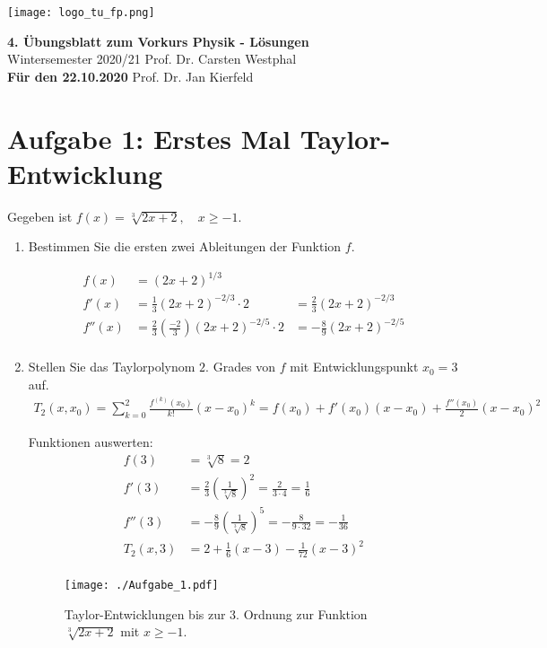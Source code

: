 \documentclass[11pt,a4paper, parskip=half ]{report}
\newcommand{\GrosserAbstand}{\\[12pt]}
\begin{document}
\texttt{[image: logo\_tu\_fp.png]}
\begin{center}
\Large{\textbf{4. \"Ubungsblatt zum Vorkurs Physik - Lösungen}}
\GrosserAbstand
\normalsize
Wintersemester 2020/21 \hfill Prof. Dr. Carsten Westphal\\
\textbf{Für den 22.10.2020} \hfill Prof. Dr. Jan Kierfeld \\
\end{center}

%
%
%
%


\section*{Aufgabe 1: Erstes Mal Taylor-Entwicklung}
  Gegeben ist $f(x) = \sqrt[3]{2x + 2}, \quad x \geq -1$.
  \begin{enumerate}
    \item Bestimmen Sie die ersten zwei Ableitungen der Funktion $f$.
    
    \vspace{20pt}
    \begin{align*}
    f(x) &= (2x + 2)^{1/3} \\ 
    f'(x) &= \frac{1}{3} (2x + 2)^{-2/3} \cdot 2 &= \frac{2}{3} (2x + 2)^{-2/3} \\ 
    f''(x) &= \frac{2}{3} \left(\frac{-2}{3}\right) (2x + 2)^{-2/5} \cdot 2 &= -\frac{8}{9} (2x + 2)^{-2/5} \\ 
    \end{align*}

    \item Stellen Sie das Taylorpolynom $2.$ Grades von $f$ mit Entwicklungspunkt $x_0 = 3$ auf.
    \vspace{20pt}
    \begin{align*}
      T_2(x, x_0) = \sum_{k = 0}^{2} \frac{f^{(k)} (x_0)}{k!} (x - x_0)^k = f(x_0) + f'(x_0)(x-x_0) + \frac{f''(x_0)}{2}(x - x_0)^2 
      \end{align*}

      Funktionen auswerten: 
      \begin{align*}
        f(3) &= \sqrt[3]{8} = 2 \\
        f'(3) &= \frac{2}{3} (\frac{1}{\sqrt[3]{8}})^2 = \frac{2}{3 \cdot 4} = \frac{1}{6} \\
        f''(3) &= -\frac{8}{9} (\frac{1}{\sqrt[3]{8}})^5 = -\frac{8}{9 \cdot 32} = - \frac{1}{36} \\
          T_2(x, 3) &= 2 + \frac{1}{6}(x-3) - \frac{1}{72}(x - 3)^2 \\
          \end{align*} 

          \begin{figure}
            \centering
            \texttt{[image: ./Aufgabe\_1.pdf]}
            \caption{Taylor-Entwicklungen bis zur 3. Ordnung zur Funktion $\sqrt[3]{2x+2}$ mit $x\geq -1$.}
            \label{fig:feynman2}
          \end{figure}
  \end{enumerate}
\end{document}
